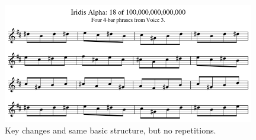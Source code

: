 \begin{figure}[H]
{
  \begin{adjustbox}{width=11cm,center}
  \includegraphics[width=11cm]{music/Voice_3_Phrasing_Tune18.png}%
    \end{adjustbox}
}\caption[]{Key changes and same basic structure, but no repetitions.}
\end{figure}

